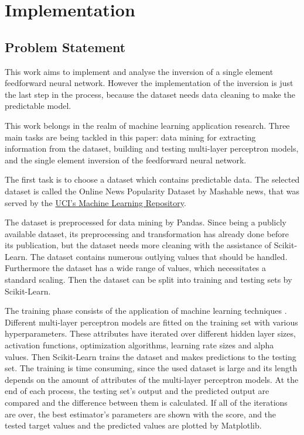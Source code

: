 \chapter{Implementation}

\section{Problem Statement}

This work aims to implement and analyse the inversion of a single element feedforward neural network. However the implementation of the inversion is just the last step in the process, because the dataset needs data cleaning to make the predictable model.\smallskip

This work belongs in the realm of machine learning application research. Three main tasks are being tackled in this paper: data mining for extracting information from the dataset, building and testing multi-layer perceptron models, and the single element inversion of the feedforward neural network. \medskip

The first task is to choose a dataset which contains predictable data. The selected dataset is called the Online News Popularity Dataset by Mashable news, that was served by the  \href{http://archive.ics.uci.edu/ml/datasets/Online+News+Popularity}{UCI's Machine Learning Repository}. \smallskip

The dataset is preprocessed for data mining by Pandas. Since being a publicly available dataset, its preprocessing and transformation has already done before its publication, but the dataset needs more cleaning with the assistance of Scikit-Learn. The dataset contains numerous outlying values that should be handled. Furthermore the dataset has a wide range of values, which necessitates a standard scaling. Then the dataset can be split into training and testing sets by Scikit-Learn. \medskip

The training phase consists of the application of machine learning techniques \cite{karayiannis2013artificial}. Different multi-layer perceptron models are fitted on the training set with various hyperparameters. These attributes have iterated over different hidden layer sizes, activation functions, optimization algorithms, learning rate sizes and alpha values. Then Scikit-Learn trains the dataset and makes predictions to the testing set. The training is time consuming, since the used dataset is large and its length depends on the amount of attributes of the multi-layer perceptron models. At the end of each process, the testing set's output and the predicted output are compared and the difference between them is calculated. If all of the iterations are over, the best estimator's parameters are shown with the score, and the tested target values and the predicted values are plotted by Matplotlib.\medskip

